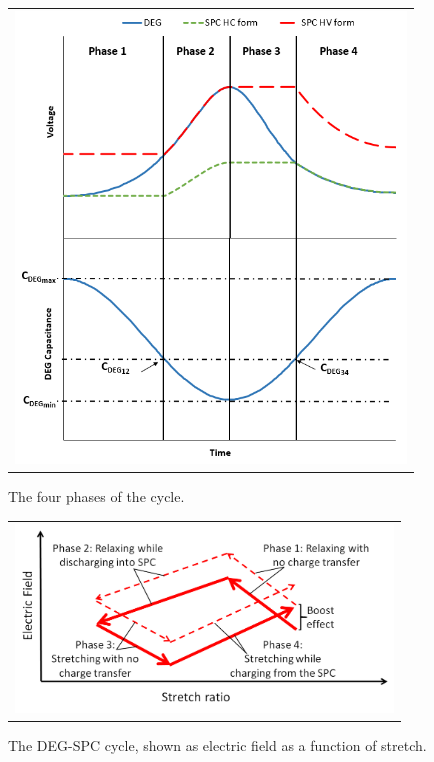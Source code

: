 \begin{figure}[ht]
\begin{center}
\begin{tabular}{c}
\includegraphics[height=12cm]{fig03/Phasestgt2.png}
\end{tabular}
\end{center}
\caption 
{ \label{fig:cycleph}
The four phases of the cycle.} 
\end{figure}

\begin{figure}[ht]
\begin{center}
\begin{tabular}{c}
\includegraphics[height=5cm]{fig03/SPC_cycle_ph2.png}\\
\end{tabular}
\end{center}
\caption 
{ \label{fig:SPCcycle}
The DEG-SPC cycle, shown as electric field as a function of stretch.} 
\end{figure}

